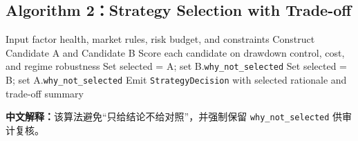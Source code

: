 \documentclass{article}
\newcommand{\tok}[1]{\nolinkurl{#1}}
\begin{document}
\subsection{Algorithm 2：Strategy Selection with Trade-off}
\begin{algorithm}[t]
\caption{Strategy Selection with Trade-off (A/B + why\_not\_selected)}
\begin{algorithmic}[1]
\STATE Input factor health, market rules, risk budget, and constraints
\STATE Construct Candidate A and Candidate B
\STATE Score each candidate on drawdown control, cost, and regime robustness
  \STATE Set selected = A; set B.\tok{why_not_selected}
\ELSE
  \STATE Set selected = B; set A.\tok{why_not_selected}
\ENDIF
\STATE Emit \tok{StrategyDecision} with selected rationale and trade-off summary
\end{algorithmic}
\end{algorithm}
\noindent\textbf{中文解释：}该算法避免“只给结论不给对照”，并强制保留 \tok{why_not_selected} 供审计复核。
\end{document}
